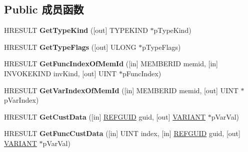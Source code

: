 \subsection*{Public 成员函数}
\begin{DoxyCompactItemize}
\item 
\mbox{\label{interface_i_type_info2_a9a02e80a171185122e132d12ab62b5d6}} 
H\+R\+E\+S\+U\+LT {\bfseries Get\+Type\+Kind} (\mbox{[}out\mbox{]} T\+Y\+P\+E\+K\+I\+ND $\ast$p\+Type\+Kind)
\item 
\mbox{\label{interface_i_type_info2_a89ce98f61bcfa49844603135b2e2df0c}} 
H\+R\+E\+S\+U\+LT {\bfseries Get\+Type\+Flags} (\mbox{[}out\mbox{]} U\+L\+O\+NG $\ast$p\+Type\+Flags)
\item 
\mbox{\label{interface_i_type_info2_a9116aa3a8c19d38f377afcf9279de0e1}} 
H\+R\+E\+S\+U\+LT {\bfseries Get\+Func\+Index\+Of\+Mem\+Id} (\mbox{[}in\mbox{]} M\+E\+M\+B\+E\+R\+ID memid, \mbox{[}in\mbox{]} I\+N\+V\+O\+K\+E\+K\+I\+ND inv\+Kind, \mbox{[}out\mbox{]} U\+I\+NT $\ast$p\+Func\+Index)
\item 
\mbox{\label{interface_i_type_info2_a86050d6aa7c7208c6a76ab0a14a73726}} 
H\+R\+E\+S\+U\+LT {\bfseries Get\+Var\+Index\+Of\+Mem\+Id} (\mbox{[}in\mbox{]} M\+E\+M\+B\+E\+R\+ID memid, \mbox{[}out\mbox{]} U\+I\+NT $\ast$p\+Var\+Index)
\item 
\mbox{\label{interface_i_type_info2_abf5c9e45291889923505e0429f241d7f}} 
H\+R\+E\+S\+U\+LT {\bfseries Get\+Cust\+Data} (\mbox{[}in\mbox{]} \hyperlink{struct___g_u_i_d}{R\+E\+F\+G\+U\+ID} guid, \mbox{[}out\mbox{]} \hyperlink{structtag_v_a_r_i_a_n_t}{V\+A\+R\+I\+A\+NT} $\ast$p\+Var\+Val)
\item 
\mbox{\label{interface_i_type_info2_a959e0b78205f1f262595a314d144e220}} 
H\+R\+E\+S\+U\+LT {\bfseries Get\+Func\+Cust\+Data} (\mbox{[}in\mbox{]} U\+I\+NT index, \mbox{[}in\mbox{]} \hyperlink{struct___g_u_i_d}{R\+E\+F\+G\+U\+ID} guid, \mbox{[}out\mbox{]} \hyperlink{structtag_v_a_r_i_a_n_t}{V\+A\+R\+I\+A\+NT} $\ast$p\+Var\+Val)
\item 
\mbox{\label{interface_i_type_info2_aea921611742e85afd7e35266b11a9328}} 

\end{DoxyCompactItemize}
